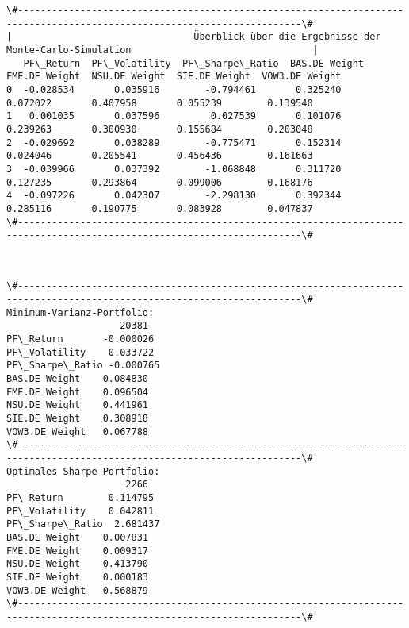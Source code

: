 \documentclass[paper=landscape]{scrartcl}
\begin{document}
    \begin{Verbatim}[commandchars=\\\{\}]
\#------------------------------------------------------------------------------------------------------------------------\#
|                                Überblick über die Ergebnisse der Monte-Carlo-Simulation                                | 
   PF\_Return  PF\_Volatility  PF\_Sharpe\_Ratio  BAS.DE Weight  FME.DE Weight  NSU.DE Weight  SIE.DE Weight  VOW3.DE Weight
0  -0.028534       0.035916        -0.794461       0.325240       0.072022       0.407958       0.055239        0.139540
1   0.001035       0.037596         0.027539       0.101076       0.239263       0.300930       0.155684        0.203048
2  -0.029692       0.038289        -0.775471       0.152314       0.024046       0.205541       0.456436        0.161663
3  -0.039966       0.037392        -1.068848       0.311720       0.127235       0.293864       0.099006        0.168176
4  -0.097226       0.042307        -2.298130       0.392344       0.285116       0.190775       0.083928        0.047837
\#------------------------------------------------------------------------------------------------------------------------\#

    \end{Verbatim}

    \begin{center}
    \end{center}
    { \hspace*{\fill} \\}
    
    \begin{Verbatim}[commandchars=\\\{\}]
\#------------------------------------------------------------------------------------------------------------------------\#
Minimum-Varianz-Portfolio: 
                    20381
PF\_Return       -0.000026
PF\_Volatility    0.033722
PF\_Sharpe\_Ratio -0.000765
BAS.DE Weight    0.084830
FME.DE Weight    0.096504
NSU.DE Weight    0.441961
SIE.DE Weight    0.308918
VOW3.DE Weight   0.067788
\#------------------------------------------------------------------------------------------------------------------------\#
Optimales Sharpe-Portfolio: 
                     2266
PF\_Return        0.114795
PF\_Volatility    0.042811
PF\_Sharpe\_Ratio  2.681437
BAS.DE Weight    0.007831
FME.DE Weight    0.009317
NSU.DE Weight    0.413790
SIE.DE Weight    0.000183
VOW3.DE Weight   0.568879
\#------------------------------------------------------------------------------------------------------------------------\#

    \end{Verbatim}
\end{document}
